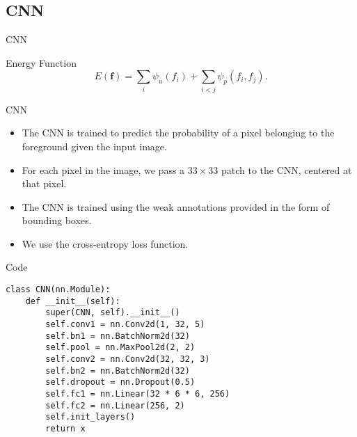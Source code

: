 \subsection{CNN}
\begin{frame}{CNN}
    \begin{block}{Energy Function}
        \begin{equation*}
            E(\mathbf{f}) = \sum_{i} \psi_u(f_{i})
                            + \sum_{i < j} \psi_p(f_{i}, f_{j}).
        \end{equation*}
    \end{block}
\end{frame}

\begin{frame}{CNN}
    \begin{itemize}
        \item<1->The CNN is trained to predict the probability of a pixel belonging
            to the foreground given the input image.
        \item<2->For each pixel in the image, we pass a $33 \times 33$ patch to
            the CNN, centered at that pixel.
        \item<3->The CNN is trained using the weak annotations provided in the
            form of bounding boxes.
        \item<4->We use the cross-entropy loss function.
    \end{itemize}
\end{frame}

\begin{frame}[fragile]{Code}
    \footnotesize
    \begin{verbatim}
class CNN(nn.Module):
    def __init__(self):
        super(CNN, self).__init__()
        self.conv1 = nn.Conv2d(1, 32, 5)
        self.bn1 = nn.BatchNorm2d(32)
        self.pool = nn.MaxPool2d(2, 2)
        self.conv2 = nn.Conv2d(32, 32, 3)
        self.bn2 = nn.BatchNorm2d(32)
        self.dropout = nn.Dropout(0.5)
        self.fc1 = nn.Linear(32 * 6 * 6, 256)
        self.fc2 = nn.Linear(256, 2)
        self.init_layers()
        return x
    \end{verbatim}
\end{frame}

